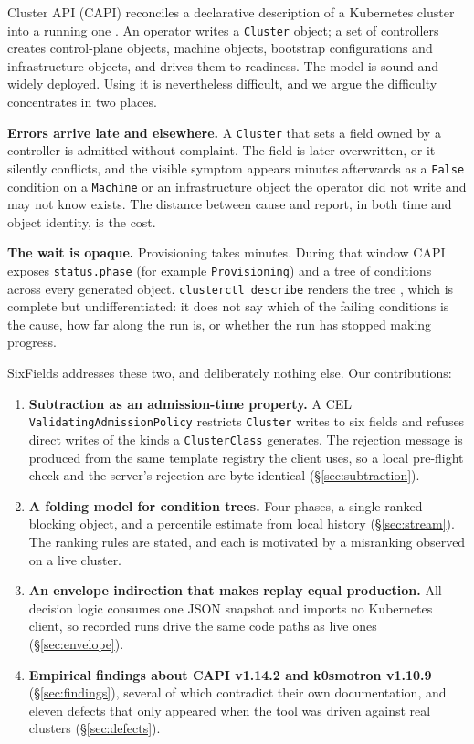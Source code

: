\documentclass[conference]{IEEEtran}
\begin{document}
Cluster API (CAPI) reconciles a declarative description of a Kubernetes cluster
into a running one \cite{capi}. An operator writes a \texttt{Cluster} object; a
set of controllers creates control-plane objects, machine objects, bootstrap
configurations and infrastructure objects, and drives them to readiness. The model
is sound and widely deployed. Using it is nevertheless difficult, and we argue the
difficulty concentrates in two places.

\textbf{Errors arrive late and elsewhere.} A \texttt{Cluster} that sets a field
owned by a controller is admitted without complaint. The field is later
overwritten, or it silently conflicts, and the visible symptom appears minutes
afterwards as a \texttt{False} condition on a \texttt{Machine} or an
infrastructure object the operator did not write and may not know exists. The
distance between cause and report, in both time and object identity, is the cost.

\textbf{The wait is opaque.} Provisioning takes minutes. During that window CAPI
exposes \texttt{status.phase} (for example \texttt{Provisioning}) and a tree of
conditions across every generated object. \texttt{clusterctl describe} renders the
tree \cite{clusterctl}, which is complete but undifferentiated: it does not say
which of the failing conditions is the cause, how far along the run is, or whether
the run has stopped making progress.

SixFields addresses these two, and deliberately nothing else. Our contributions:

\begin{enumerate}
\item \textbf{Subtraction as an admission-time property.} A CEL
\texttt{ValidatingAdmissionPolicy} \cite{vap} restricts \texttt{Cluster} writes to
six fields and refuses direct writes of the kinds a \texttt{ClusterClass}
generates. The rejection message is produced from the same template registry the
client uses, so a local pre-flight check and the server's rejection are
byte-identical (\S\ref{sec:subtraction}).
\item \textbf{A folding model for condition trees.} Four phases, a single ranked
blocking object, and a percentile estimate from local history
(\S\ref{sec:stream}). The ranking rules are stated, and each is motivated by a
misranking observed on a live cluster.
\item \textbf{An envelope indirection that makes replay equal production.} All
decision logic consumes one JSON snapshot and imports no Kubernetes client, so
recorded runs drive the same code paths as live ones (\S\ref{sec:envelope}).
\item \textbf{Empirical findings about CAPI v1.14.2 and k0smotron v1.10.9}
(\S\ref{sec:findings}), several of which contradict their own documentation, and
eleven defects that only appeared when the tool was driven against real clusters
(\S\ref{sec:defects}).
\end{enumerate}
\end{document}

